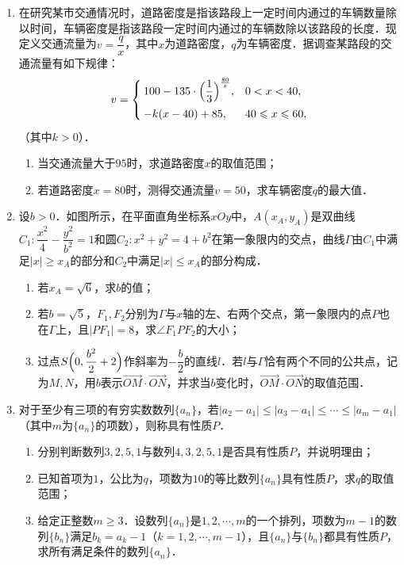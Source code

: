 \begin{description}
\begin{enumerate}[leftmargin=5pt]
\begin{enumerate}[label=(\arabic*)]
        \end{enumerate}        \item 在研究某市交通情况时，道路密度是指该路段上一定时间内通过的车辆数量除以时间，车辆密度是指该路段一定时间内通过的车辆数除以该路段的长度．现定义交通流量为$v=\dfrac{q}{x}$，其中$x$为道路密度，$q$为车辆密度．据调查某路段的交通流量有如下规律：$$v=\begin{cases}100-135\cdot\Bigl(\dfrac{1}{3}\Bigr)^{\frac{80}{x}},&0<x<40,\\[6pt]-k(x-40)+85,&40\leqslant x\leqslant 60,\end{cases}$$（其中$k>0$）．
        \begin{enumerate}[label=(\arabic*)]
            \item 当交通流量大于$95$时，求道路密度$x$的取值范围；
            \item 若道路密度$x=80$时，测得交通流量$v=50$，求车辆密度$q$的最大值．
        \end{enumerate}
        \item 设$b>0$．如图所示，在平面直角坐标系$xOy$中，$A(x_{A},y_{A})$是双曲线$C_{1}:\dfrac{x^{2}}{4}-\dfrac{y^{2}}{b^{2}}=1$和圆$C_{2}:x^{2}+y^{2}=4+b^{2}$在第一象限内的交点，曲线$\Gamma$由$C_{1}$中满足$|x|\geqslant x_{A}$的部分和$C_{2}$中满足$|x|\leqslant x_{A}$的部分构成．
        \begin{enumerate}[label=(\arabic*)]
            \item 若$x_{A}=\sqrt{6}$，求$b$的值；
            \item 若$b=\sqrt{5}$，$F_{1},F_{2}$分别为$\Gamma$与$x$轴的左、右两个交点，第一象限内的点$P$也在$\Gamma$上，且$|PF_{1}|=8$，求$\angle F_{1}PF_{2}$的大小；
            \item 过点$S\Bigl(0,\dfrac{b^{2}}{2}+2\Bigr)$作斜率为$-\dfrac{b}{2}$的直线$l$．若$l$与$\Gamma$恰有两个不同的公共点，记为$M,N$，用$b$表示$\overrightarrow{OM}\cdot\overrightarrow{ON}$，并求当$b$变化时，$\overrightarrow{OM}\cdot\overrightarrow{ON}$的取值范围．
        \end{enumerate}
        \item 对于至少有三项的有穷实数数列$\{a_{n}\}$，若$|a_{2}-a_{1}|\leqslant|a_{3}-a_{1}|\leqslant\cdots\leqslant|a_{m}-a_{1}|$（其中$m$为$\{a_{n}\}$的项数），则称具有性质$P$．
        \begin{enumerate}[label=(\arabic*)]
            \item 分别判断数列$3,2,5,1$与数列$4,3,2,5,1$是否具有性质$P$，并说明理由；
            \item 已知首项为$1$，公比为$q$，项数为$10$的等比数列$\{a_{n}\}$具有性质$P$，求$q$的取值范围；
            \item 给定正整数$m\geqslant 3$．设数列$\{a_{n}\}$是$1,2,\cdots,m$的一个排列，项数为$m-1$的数列$\{b_{n}\}$满足$b_{k}=a_{k}-1$（$k=1,2,\cdots,m-1$），且$\{a_{n}\}$与$\{b_{n}\}$都具有性质$P$，求所有满足条件的数列$\{a_{n}\}$．
        \end{enumerate}
    \end{enumerate}
\end{description}
\clearpage


